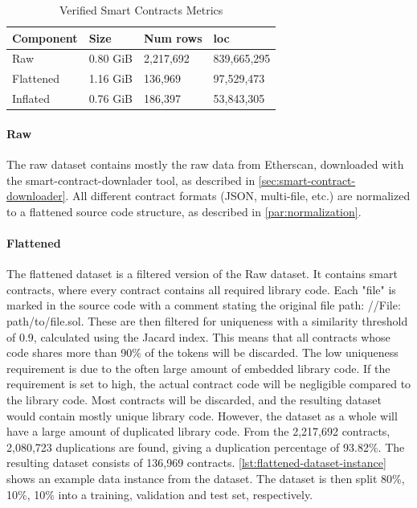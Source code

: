 \begin{table}
    \def\arraystretch{1.5}
    \small
    \centering
    \caption{Verified Smart Contracts Metrics}
    \label{tab:verified-smart-contracts-metrics}
    \begin{tabularx}{\textwidth}{XXXX}
        \toprule
        \textbf{Component} & \textbf{Size} &  \textbf{Num rows} & \textbf{\acrshort{loc}}\\
        \midrule
        Raw & 0.80 GiB & 2,217,692 & 839,665,295\\
        Flattened & 1.16 GiB & 136,969 & 97,529,473\\
        Inflated & 0.76 GiB & 186,397 & 53,843,305\\
        \bottomrule
    \end{tabularx}
\end{table}

\paragraph{Raw}
\label{sec:verified-smart-contracts-raw}
The raw dataset contains mostly the raw data from Etherscan, downloaded with the smart-contract-downlader tool, as described in \cref{sec:smart-contract-downloader}. All different contract formats (JSON, multi-file, etc.) are normalized to a flattened source code structure, as described in \cref{par:normalization}.

\paragraph{Flattened}
\label{sec:verified-smart-contracts-flattened}

The flattened dataset is a filtered version of the Raw dataset. It contains smart contracts, where every contract contains all required library code. Each "file" is marked in the source code with a comment stating the original file path: //File: path/to/file.sol. These are then filtered for uniqueness with a similarity threshold of 0.9,  calculated using the Jacard index. This means that all contracts whose code shares more than 90\% of the tokens will be discarded. The low uniqueness requirement is due to the often large amount of embedded library code. If the requirement is set to high, the actual contract code will be negligible compared to the library code. Most contracts will be discarded, and the resulting dataset would contain mostly unique library code. However, the dataset as a whole will have a large amount of duplicated library code. From the 2,217,692 contracts, 2,080,723 duplications are found, giving a duplication percentage of 93.82\%. The resulting dataset consists of 136,969 contracts. \cref{lst:flattened-dataset-instance} shows an example data instance from the dataset. The dataset is then split 80\%, 10\%, 10\% into a training, validation and test set, respectively.

